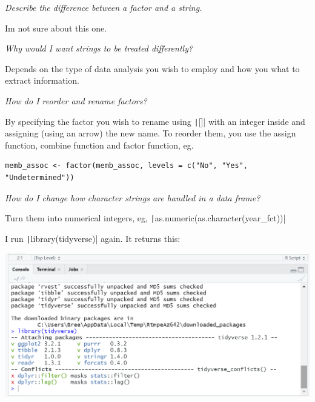 \documentclass{article}
\begin{document}
\textit{Describe the difference between a factor and a string.}

Im not sure about this one.

\textit{Why would I want strings to be treated differently?}

Depends on the type of data analysis you wish to employ and how you what to extract information.

\textit{How do I reorder and rename factors?}

By specifying the factor you wish to rename using \texttt|[]| with an integer inside and assigning (using an arrow) the new name. To reorder them, you use the assign function, combine function and factor function, eg.

\ifprintCode
\begin{verbatim}
memb_assoc <- factor(memb_assoc, levels = c("No", "Yes", "Undetermined"))
\end{verbatim}
\fi

\textit{How do I change how character strings are handled in a data frame?}

Turn them into numerical integers, eg, \texttt|as.numeric(as.character(year\_fct))|


I run \texttt|library(tidyverse)| again. It returns this:

\includegraphics[width=1.0\textwidth]{rstudio_14.PNG}
\end{document}

